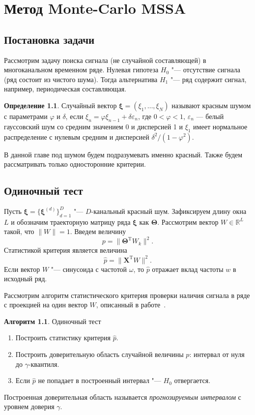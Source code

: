 \documentclass[specialist,
substylefile = spbu_report.rtx,
subf,href,colorlinks=true, 12pt]{disser}
\newcommand{\traj}{\mathbf{X}}
\newcommand{\transponse}{^\mathrm{T}}
\theoremstyle{definition}
\newtheorem{definition}{Определение}
\newtheorem{algorithm}{Алгоритм}
\newcommand{\R}{\mathbb{R}}
\begin{document}
	\chapter{Метод Monte-Carlo MSSA}
	\section{Постановка задачи}
	Рассмотрим задачу поиска сигнала (не случайной составляющей) в многоканальном временном ряде. Нулевая гипотеза $H_0$ "--- отсутствие сигнала (ряд состоит из чистого шума). Тогда альтернатива $H_1$ "--- ряд содержит сигнал, например, периодическая составляющая.
	\begin{definition}
		Случайный вектор $\boldsymbol{\xi}=(\xi_1,\dots,\xi_N)$ называют красным шумом с параметрами $\varphi$ и $\delta$, если $\xi_n = \varphi\xi_{n-1} + \delta\varepsilon_n$, где $0<\varphi<1$, $\varepsilon_n$ — белый гауссовский шум со средним значением 0 и дисперсией 1 и $\xi_1$ имеет нормальное распределение с нулевым средним и дисперсией $\delta^2/(1-\varphi^2)$.
	\end{definition}
	В данной главе под шумом будем подразумевать именно красный. Также будем рассматривать только односторонние критерии.
	\section{Одиночный тест}
	Пусть $\boldsymbol{\xi}=\{\boldsymbol{\xi}^{(d)}\}_{d=1}^D$ "--- $D$-канальный красный шум. Зафиксируем длину окна $L$ и обозначим траекторную матрицу ряда $\boldsymbol{\xi}$ как $\mathbf\Theta$. Рассмотрим вектор $W\in \R^{L}$ такой, что $\|W\|=1$. Введем величину
	\[
	p=\|\mathbf{\Theta}\transponse W_k\|^2.
	\]
	Статистикой критерия является величина
	\[
	\widehat{p}=\|\traj\transponse W\|^2.
	\]
	Если вектор $W$ "--- синусоида с частотой $\omega$, то $\widehat{p}$ отражает вклад частоты $w$ в исходный ряд.
	
	Рассмотрим алгоритм статистического критерия проверки наличия сигнала в ряде с проекцией на один вектор $W$, описанный в работе~\cite{golyandina2021detection}.
	\begin{algorithm}{Одиночный тест~\cite{golyandina2021detection}}
		\begin{enumerate}
			\item Построить статистику критерия $\widehat p$.
			\item Построить доверительную область случайной величины $p$: интервал от нуля до $\gamma$-квантиля.
			\item Если $\widehat p$	не попадает в построенный интервал "--- $H_0$ отвергается. 
		\end{enumerate}
	\end{algorithm}
	Построенная доверительная область называется \textit{прогнозируемым интервалом} с уровнем доверия $\gamma$.
	
\end{document}
